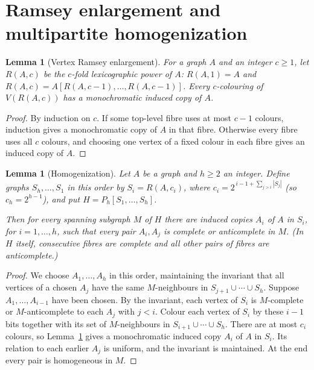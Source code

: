 \documentclass[11pt,a4paper]{article}
\newtheorem{lemma}[theorem]{Lemma}
\theoremstyle{definition}
\theoremstyle{remark}
\numberwithin{equation}{section}
\begin{document}
\section{Ramsey enlargement and multipartite homogenization}\label{sec:ramsey}
\begin{lemma}[Vertex Ramsey enlargement]\label{lem:ramsey}
For a graph \(A\) and an integer \(c\ge1\), let \(R(A,c)\) be the \(c\)-fold lexicographic power of \(A\): \(R(A,1)=A\) and \(R(A,c)=A[R(A,c-1),\ldots,R(A,c-1)]\). Every \(c\)-colouring of \(V(R(A,c))\) has a monochromatic induced copy of \(A\).


\end{lemma}\begin{proof}
By induction on \(c\). If some top-level fibre uses at most \(c-1\) colours, induction gives a monochromatic copy of \(A\) in that fibre. Otherwise every fibre uses all \(c\) colours, and choosing one vertex of a fixed colour in each fibre gives an induced copy of \(A\).
\end{proof}
\begin{lemma}[Homogenization]\label{lem:homogenize}
Let \(A\) be a graph and \(h\ge2\) an integer. Define graphs \(S_{h},\ldots,S_{1}\) in this order by \(S_{i}=R(A,c_{i})\), where \(c_{i}=2^{\,i-1+\sum_{j>i}|S_{j}|}\) (so \(c_{h}=2^{h-1}\)), and put \(H=P_{h}[S_{1},\ldots,S_{h}]\).

Then for every spanning subgraph \(M\) of \(H\) there are induced copies \(A_{i}\) of \(A\) in \(S_{i}\), for \(i=1,\ldots,h\), such that every pair \(A_{i},A_{j}\) is complete or anticomplete in \(M\). (In \(H\) itself, consecutive fibres are complete and all other pairs of fibres are anticomplete.)
\end{lemma}\begin{proof}
We choose \(A_{1},\ldots,A_{h}\) in this order, maintaining the invariant that all vertices of a chosen \(A_{j}\) have the same \(M\)-neighbours in \(S_{j+1}\cup\cdots\cup S_{h}\). Suppose \(A_1,\ldots,A_{i-1}\) have been chosen. By the invariant, each vertex of \(S_{i}\) is \(M\)-complete or \(M\)-anticomplete to each \(A_{j}\) with \(j<i\). Colour each vertex of \(S_{i}\) by these \(i-1\) bits together with its set of \(M\)-neighbours in \(S_{i+1}\cup\cdots\cup S_{h}\). There are at most \(c_{i}\) colours, so Lemma~\ref{lem:ramsey} gives a monochromatic induced copy \(A_{i}\) of \(A\) in \(S_i\). Its relation to each earlier \(A_{j}\) is uniform, and the invariant is maintained. At the end every pair is homogeneous in \(M\).


\end{proof}
\end{document}
